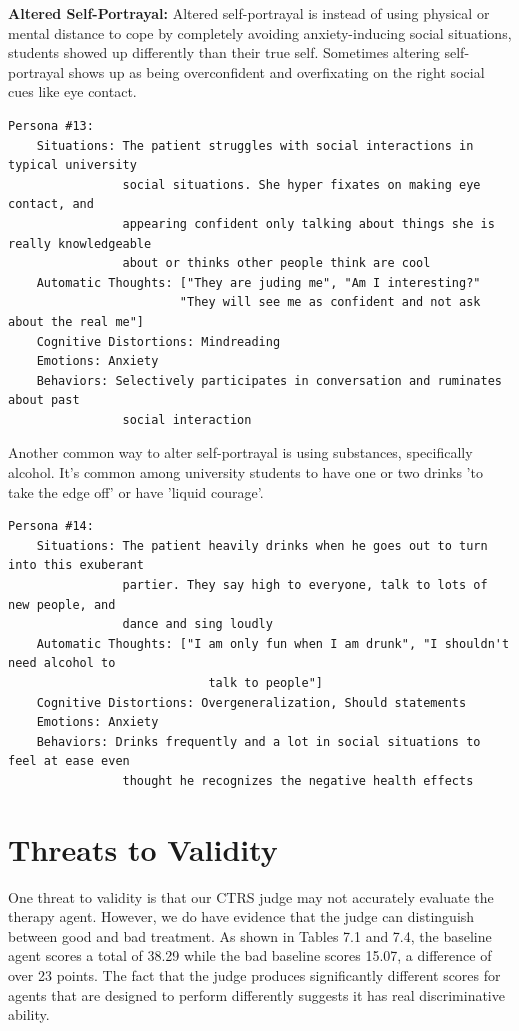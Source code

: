 \documentclass[twoside]{report}
\begin{document}
\textbf{Altered Self-Portrayal:} Altered self-portrayal is instead of using physical or mental distance to cope by completely avoiding anxiety-inducing social situations, students showed up differently than their true self. Sometimes altering self-portrayal shows up as being overconfident and overfixating on the right social cues like eye contact. \cite{lee2022socially}

\begin{verbatim}
Persona #13:
    Situations: The patient struggles with social interactions in typical university 
                social situations. She hyper fixates on making eye contact, and
                appearing confident only talking about things she is really knowledgeable
                about or thinks other people think are cool
    Automatic Thoughts: ["They are juding me", "Am I interesting?"
                        "They will see me as confident and not ask about the real me"]
    Cognitive Distortions: Mindreading
    Emotions: Anxiety
    Behaviors: Selectively participates in conversation and ruminates about past
                social interaction
\end{verbatim}
Another common way to alter self-portrayal is using substances, specifically alcohol. It's common among university students to have one or two drinks 'to take the edge off' or have 'liquid courage'. 
\begin{verbatim}
Persona #14:
    Situations: The patient heavily drinks when he goes out to turn into this exuberant
                partier. They say high to everyone, talk to lots of new people, and 
                dance and sing loudly
    Automatic Thoughts: ["I am only fun when I am drunk", "I shouldn't need alcohol to
                            talk to people"]
    Cognitive Distortions: Overgeneralization, Should statements
    Emotions: Anxiety
    Behaviors: Drinks frequently and a lot in social situations to feel at ease even
                thought he recognizes the negative health effects
\end{verbatim}

\section{Threats to Validity}
One threat to validity is that our CTRS judge may not accurately evaluate the therapy agent. However, we do have evidence that the judge can distinguish between good and bad treatment. As shown in Tables 7.1 and 7.4, the baseline agent scores a total of 38.29 while the bad baseline scores 15.07, a difference of over 23 points. The fact that the judge produces significantly different scores for agents that are designed to perform differently suggests it has real discriminative ability.
\end{document}
